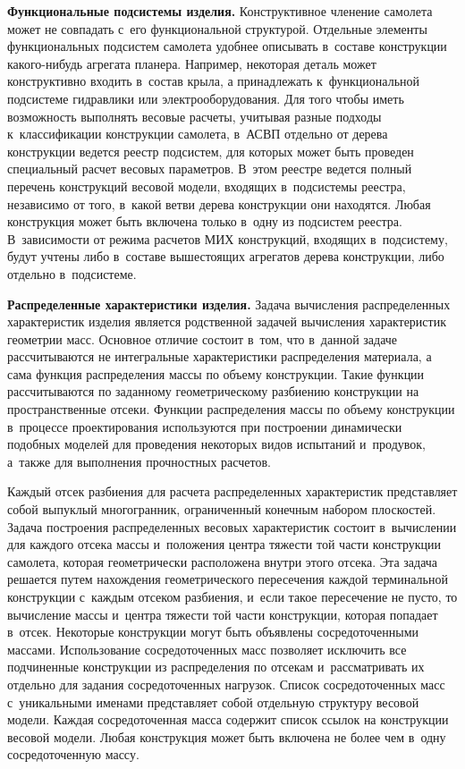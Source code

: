 \begin{multicols}{2}
  \textbf{Функциональные подсистемы изделия.} Конст\-рук\-тив\-ное членение 
самолета может не совпадать с~его функциональной структурой. Отдельные\linebreak 
элементы функциональных подсистем самолета удобнее описывать в~составе 
конструкции ка\-ко\-го-ни\-будь агрегата планера. Например, некоторая деталь 
может конструктивно входить в~состав крыла, а принадлежать 
к~функциональной подсистеме гидравлики или электрооборудования. Для того 
чтобы иметь возможность выполнять весовые расчеты, учитывая разные 
подходы к~классификации конструкции самолета, в~АСВП отдельно от дерева 
конструкции ведется реестр подсистем, для которых может быть проведен 
специальный расчет весовых параметров. В~этом реестре ведется полный 
перечень конструкций весовой модели, входящих в~подсистемы реестра, 
независимо от того, в~какой ветви дерева конструкции они находятся. Любая 
конструкция может быть включена только в~одну из подсистем реестра. 
В~зависимости от режима расчетов МИХ
конструкций, входящих в~под\-сис\-те\-му, будут учтены либо в~со\-ста\-ве 
вышестоящих агрегатов дерева конструкции, либо отдельно в~под\-сис\-теме. 
{

}
  
  \textbf{Распределенные характеристики изделия.} Задача вычисления 
распределенных характеристик изделия является родственной задачей 
вычисления характеристик геометрии масс. Основное отличие состоит в~том, 
что в~данной задаче рассчитываются не интегральные характеристики 
распределения материала, а сама функция распределения массы по объему 
конструкции. Такие функции рассчитываются по заданному геометрическому 
разбиению конструкции на пространственные отсеки. Функции распределения 
массы по объему конструкции в~процессе проектирования используются при 
построении динамически подобных моделей для проведения некоторых видов 
испытаний и~продувок, а~также для выполнения прочностных расчетов. 
  
  Каждый отсек разбиения для расчета распределенных характеристик 
представляет собой вы\-пук\-лый многогранник, ограниченный конечным набором 
плоскостей. Задача построения распределенных весовых характеристик состоит 
в~вычислении для каждого отсека массы и~положения центра тяжести той части 
конструкции самолета, которая геометрически расположена внутри этого 
отсека. Эта задача решается путем нахождения геометрического пересечения 
каждой терминальной конструкции с~каждым отсеком разбиения, и~если такое 
пересечение не пусто, то вычисление массы и~центра тяжести той части 
конструкции, которая попадает в~отсек. Некоторые конструкции могут быть 
объявлены сосредоточенными массами. Использование сосредоточенных масс 
позволяет исключить все подчиненные конструкции из распределения по 
отсекам и~рассматривать их отдельно для задания сосредоточенных нагрузок. 
Список сосредоточенных масс с~уникальными именами представляет собой 
отдельную структуру весовой модели. Каждая сосредоточенная масса содержит 
список ссылок на конструкции весовой модели. Любая конструкция может 
быть включена не более чем в~одну сосредоточенную массу.
  

\end{multicols}
